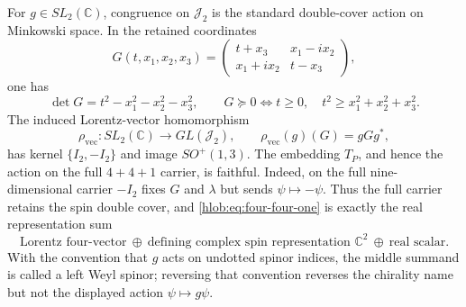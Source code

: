 \begin{theorem}
For \(g\in SL_2(\mathbb C)\), congruence on \(\mathcal J_2\) is the standard
double-cover action on Minkowski space.  In the retained coordinates
\begin{equation}
 G(t,x_1,x_2,x_3)=
 \begin{pmatrix}
  t+x_3&x_1-i x_2\\
  x_1+i x_2&t-x_3
 \end{pmatrix},
 \label{hlob:eq:pauli-coordinates}
\end{equation}
one has
\begin{equation}
 \det G=t^2-x_1^2-x_2^2-x_3^2,
 \qquad
 G\succeq0\Longleftrightarrow
 t\geq0,\quad t^2\geq x_1^2+x_2^2+x_3^2.
 \label{hlob:eq:lorentz-cone}
\end{equation}
The induced Lorentz-vector homomorphism
\begin{equation}
 \rho_{\mathrm{vec}}:SL_2(\mathbb C)\longrightarrow
 GL(\mathcal J_2),\qquad
 \rho_{\mathrm{vec}}(g)(G)=gGg^*,
 \label{hlob:eq:rho-vector}
\end{equation}
has kernel \(\{I_2,-I_2\}\) and image \(SO^+(1,3)\).  The embedding
\(T_P\), and hence the action on the full \(4+4+1\) carrier, is faithful.
Indeed, on the full nine-dimensional carrier
\(-I_2\) fixes \(G\) and \(\lambda\) but sends
\(\psi\mapsto-\psi\).  Thus the full carrier retains the spin double cover,
and \eqref{hlob:eq:four-four-one} is exactly the real representation sum
\begin{equation}
 \boxed{
 \text{Lorentz four-vector}\ \oplus\
 \text{defining complex spin representation }\mathbb C^2\ \oplus\
 \text{real scalar}.}
 \label{hlob:eq:representation-sum}
\end{equation}
With the convention that \(g\) acts on undotted spinor indices, the middle
summand is called a left Weyl spinor; reversing that convention reverses the
chirality name but not the displayed action \(\psi\mapsto g\psi\).
\end{theorem}

